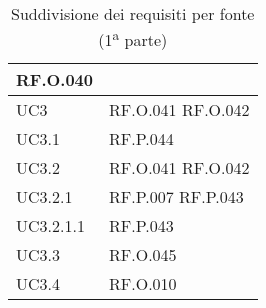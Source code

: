 \begin{table}[H]
\begin{tabular}{|C{3.0cm}|C{3.0cm}|}
        RF.O.040\\
        \hline
        UC3 &
        RF.O.041 \newline
        RF.O.042 \\
        \hline
        UC3.1 &
        RF.P.044 \\
        \hline
        UC3.2 &
        RF.O.041 \newline
        RF.O.042 \\
        \hline
        UC3.2.1 &
        RF.P.007 \newline
        RF.P.043 \\
        \hline
        UC3.2.1.1 &
        RF.P.043 \\
        \hline
        UC3.3 &
        RF.O.045 \\
        \hline
        UC3.4 &
        RF.O.010 \\
        \hline
        \end{tabular}
    \caption{Suddivisione dei requisiti per fonte (1\textsuperscript{a} parte)}
\end{table}
